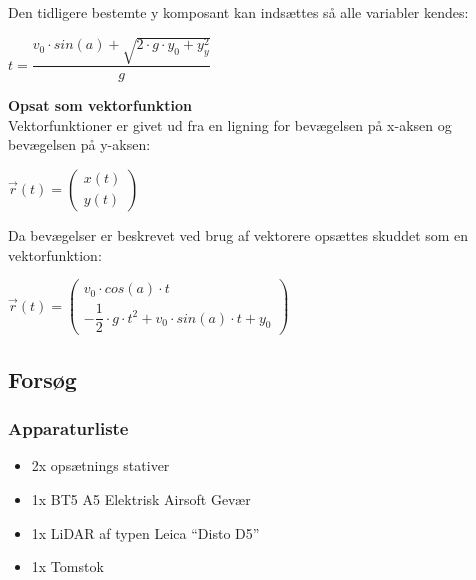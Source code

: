 Den tidligere bestemte y komposant kan indsættes så alle variabler kendes:\\

\begin{center}
\begin{math}
t = \dfrac{v_{0} \cdot sin(a) + \sqrt{2 \cdot g \cdot y_{0} + y^{2}_{y}}}{g}
\end{math}
\end{center}

\textbf{Opsat som vektorfunktion}\\
Vektorfunktioner er givet ud fra en ligning for bevægelsen på x-aksen og bevægelsen på y-aksen:

\begin{center}
\begin{math}
\overrightarrow{r}(t) = 
\begin{pmatrix}
x(t)\\
y(t)
\end{pmatrix}
\end{math}
\end{center}

Da bevægelser er beskrevet ved brug af vektorere opsættes skuddet som en vektorfunktion:

\begin{center}
\begin{math}
\overrightarrow{r}(t) = 
\begin{pmatrix}
v_{0} \cdot cos(a) \cdot t\\
- \dfrac{1}{2} \cdot g \cdot t^{2} + v_{0} \cdot sin(a) \cdot t + y_{0}
\end{pmatrix}
\end{math}
\end{center}

\subsection{Forsøg}
\subsubsection{Apparaturliste}
\begin{itemize}
\item 2x opsætnings stativer
\item 1x BT5 A5 Elektrisk Airsoft Gevær
\item 1x LiDAR af typen Leica “Disto D5”
\item 1x Tomstok
\end{itemize}

